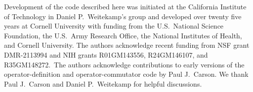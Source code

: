 
Development of the code described here was initiated at the California Institute of Technology in Daniel P.\ Weitekamp's group and developed over twenty five years at Cornell University with funding from the U.S.\ National Science Foundation, the U.S.\ Army Research Office, the National Institutes of Health, and Cornell University.
The authors acknowledge recent funding from NSF grant DMR-2113994 and NIH grants R01GM143556, R24GM146107, and R35GM148272.\
The authors acknowledge contributions to early versions of the operator-definition and operator-commutator code by Paul J.\ Carson.
We thank Paul J.\ Carson and Daniel P.\ Weitekamp for helpful discussions.